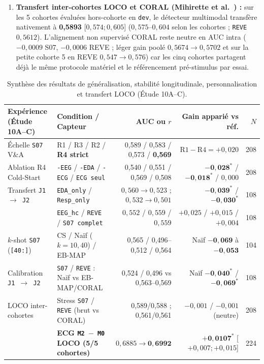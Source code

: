 \documentclass[10pt]{article}
\begin{document}
\begin{enumerate}
\item \textbf{Transfert inter-cohortes LOCO et CORAL (Mihirette et al.\ \cite{mihirette2025}) :} sur les 5 cohortes évaluées hors-cohorte en \texttt{dev}, le détecteur multimodal transfère nativement à \textbf{0,5893} [$0{,}574 ; 0{,}605$] ($0{,}575$--$0{,}604$ selon les cohortes ; \texttt{REVE} $0{,}5612$). L'alignement non supervisé CORAL reste neutre en AUC intra ($-0{,}0009$ S07, $-0{,}0006$ REVE ; léger gain poolé $0{,}5674 \to 0{,}5702$ et sur la petite cohorte 5 en REVE $0{,}547 \to 0{,}576$) car les cinq cohortes partagent déjà le même protocole matériel et le référencement pré-stimulus par essai.
\end{enumerate}

\begin{table}[t]
\centering\scriptsize\setlength{\tabcolsep}{3.5pt}
\begin{tabular}{@{}llrrr@{}}
\toprule
Expérience (Étude 10A--C) & Condition / Capteur & AUC ou $r$ & Gain apparié vs réf. & $N$\\
\midrule
Échelle \texttt{S07} V\&A & R1 / R3 / R2 / \textbf{R4 strict} & 0,589 / 0,583 / 0,573 / \textbf{0,569} & $\text{R1}-\text{R4} = +0{,}020$ & 208\\
Ablation R4 Cold-Start & \texttt{-EEG} / \texttt{-EDA} / \texttt{-ECG} / \texttt{ECG seul} & 0,540 / 0,551 / 0,569 / 0,508 & $\mathbf{-0{,}028^*}$ / $\mathbf{-0{,}018^*}$ / $0{,}000$ & 208\\
\midrule
Transfert \texttt{J1 $\to$ J2} & \texttt{EDA\_only} / \texttt{Resp\_only} & $0{,}560 \to 0{,}523$ ; $0{,}532 \to 0{,}501$ & $\mathbf{-0{,}039^*}$ / $\mathbf{-0{,}030^*}$ & 108\\
 & \texttt{EEG\_hc} / \texttt{REVE} / \texttt{S07 complet} & $0{,}552$ / $0{,}559$ / $0{,}559$ & $+0{,}025$ / $+0{,}015$ / $+0{,}004$ & 108\\
\midrule
$k$-shot \texttt{S07} (\texttt{[40:]}) & CS / Naïf ($k=10, 40$) / EB-MAP & 0,565 / 0,496--0,512 / 0,564 & Naïf $\mathbf{-0{,}069}$ à $\mathbf{-0{,}053}$ & 104\\
Calibration \texttt{J1 $\to$ J2} & \texttt{S07} / \texttt{REVE} : Naïf vs EB-MAP/CORAL & 0,524 / 0,496 vs 0,563--0,569 & Naïf $\mathbf{-0{,}040^*}$ / $\mathbf{-0{,}069^*}$ & 108\\
\midrule
LOCO inter-cohortes & Stress \texttt{S07} / \texttt{REVE} (brut vs CORAL) & 0,589/0,588 ; 0,561/0,561 & $-0{,}001$ / $-0{,}001$ (neutre) & 208\\
 & \textbf{ECG \texttt{M2 $-$ M0} LOCO (5/5 cohortes)} & $0{,}6885 \to \mathbf{0{,}6992}$ & $\mathbf{+0{,}0107^*}$ [$+0{,}007 ; +0{,}015$] & 224\\
\bottomrule
\end{tabular}
\caption{Synthèse des résultats de généralisation, stabilité longitudinale, personnalisation et transfert LOCO (Étude 10A--C).}
\label{tab:study10_gen}
\end{table}
\end{document}
